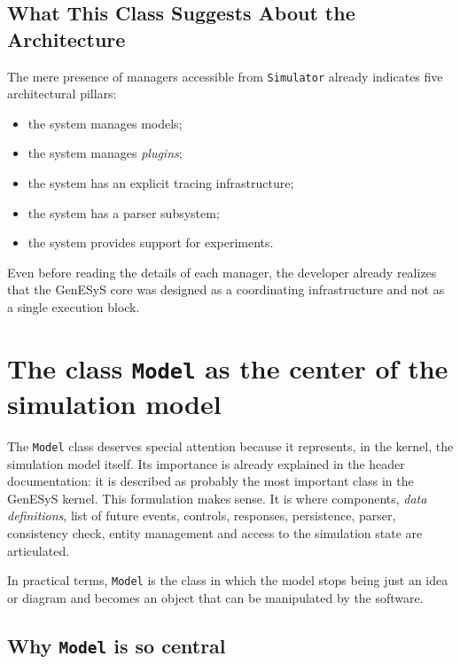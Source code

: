 \subsection{What This Class Suggests About the Architecture}
\label{subsec:cap7_o_que_simulator_sugere}

The mere presence of managers accessible from \texttt{Simulator} already indicates five architectural pillars:
\begin{itemize}
 \item the system manages models;
 \item the system manages \textit{plugins};
 \item the system has an explicit tracing infrastructure;
 \item the system has a parser subsystem;
 \item the system provides support for experiments.
\end{itemize}

Even before reading the details of each manager, the developer already realizes that the GenESyS core was designed as a coordinating infrastructure and not as a single execution block.

\section{The class \texttt{Model} as the center of the simulation model}
\label{sec:cap7_classe_model}

The \texttt{Model} class deserves special attention because it represents, in the kernel, the simulation model itself. Its importance is already explained in the header documentation: it is described as probably the most important class in the GenESyS kernel. This formulation makes sense. It is where components, \textit{data definitions}, list of future events, controls, responses, persistence, parser, consistency check, entity management and access to the simulation state are articulated.

In practical terms, \texttt{Model} is the class in which the model stops being just an idea or diagram and becomes an object that can be manipulated by the software.

\subsection{Why \texttt{Model} is so central}
\label{subsec:cap7_por_que_model_central}

